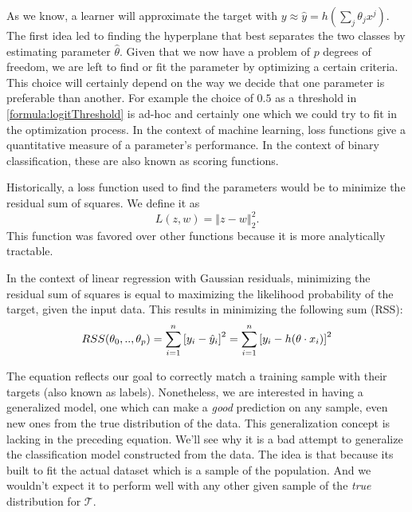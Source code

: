 As we know, a learner will approximate the target with $y \approx \hat{y} = h\left(\sum_{j}\theta_j x^j\right)$. The first idea led to finding the hyperplane that best separates the two classes by estimating parameter $\hat{\theta}$. Given that we now have a problem of $p$ degrees of freedom, we are left to find or fit the parameter by optimizing a certain criteria. This choice will certainly depend on the way we decide that one parameter is preferable than another. For example the choice of $0.5$ as a threshold in \cref{formula:logitThreshold} is ad-hoc and certainly one which we could try to fit in the optimization process. In the context of machine learning, loss functions give a quantitative measure of a parameter's performance. In the context of binary classification, these are also known as scoring functions.

Historically, a loss function used to find the parameters would be to minimize the residual sum of squares.
We define it as $$L(z,w) = \left\Vert z-w \right\Vert^2_2 .$$
This function was favored over other functions because it is more analytically tractable.

In the context of linear regression with Gaussian residuals, minimizing the residual sum of squares is equal to maximizing the likelihood probability of the target, given the input data. This results in minimizing the following sum (RSS):
\begin{equation}\label{eq:rss}
RSS(\theta_0,..,\theta_p) = \sum_{i=1}^n {[y_i - \hat{y}_i ] }^2 \\
= \sum_{i=1}^n  {[y_i - h( \theta \cdot x_i)] }^2
\end{equation}

The equation reflects our goal to correctly match a training sample with their targets (also known as labels). Nonetheless, we are interested in having a generalized model, one which can make a \textit{good} prediction on any sample, even new ones from the true distribution of the data.
This generalization concept is lacking in the preceding equation. We'll see why it is a bad attempt to generalize the classification model constructed from the data. The idea is that because its built to fit the actual dataset which is a sample of the population. And we wouldn't expect it to perform well with any other given sample of the \textit{true} distribution for $\mathcal{T}$.
